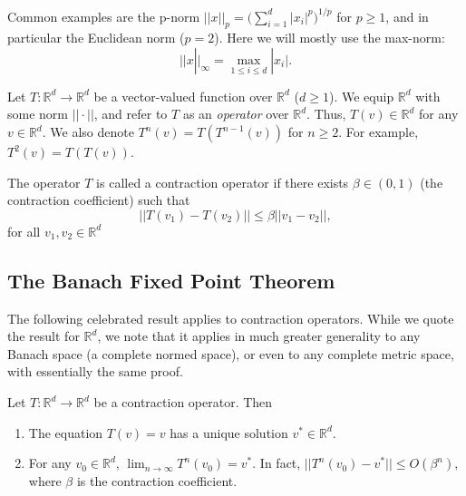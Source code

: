 Common examples are the p-norm $||x|{|_p} = (\sum\nolimits_{i = 1}^d
{{{|{x_i}|}^p}{)^{1/p}}} $ for $p \ge 1$, and in particular the
Euclidean norm ($p = 2$). Here we will mostly use the max-norm:
\[||x|{|_\infty } = {\max _{1 \le i \le d}}|{x_i}|.\]

Let $T:\mathbb R^d \to \mathbb R^d$  be a vector-valued function
over $\mathbb R^d$   ($d \ge 1$).
%
We equip $\mathbb R^d$ with some norm $||
\cdot ||$, and refer to $T$ as an \emph{operator } over $\mathbb
R^d$. Thus, $T(v) \in \mathbb R^d$ for any $v \in \mathbb R^d$. We
also denote ${T^n}(v) = T({T^{n - 1}}(v))$ for  $n \ge 2$. For
example, ${T^2}(v) = T(T(v))$.

\begin{definition} The operator $T$ is called a contraction operator if there exists $\beta  \in (0,1)$ (the contraction coefficient) such that
\[||T({v_1}) - T({v_2})|| \le \beta ||{v_1} - {v_2}||,\]
for all $v_1,v_2 \in \mathbb R^d$
\end{definition}

\subsection{The Banach Fixed Point Theorem}
The following celebrated result applies to contraction operators. While we quote the result for $\mathbb R^d$, we note that it applies in much greater generality to any Banach space (a complete normed space), or even to any complete metric space, with essentially the same proof.

\begin{theorem}
\label{chapter-discount:thm:Banach}
 Let $T:\mathbb R^d \to \mathbb R^d$  be a
contraction operator. Then
\begin{enumerate}
  \item The equation $T(v) = v$ has a unique solution  $v^*\in \mathbb R^d$.
  \item For any $v_0 \in \mathbb R^d$,  ${\lim _{n \to \infty }}{T^n}({v_0}) = {v^*}$.
          In fact,  $||{T^n}({v_0}) - {v^*}|| \le O({\beta ^n})$, where $\beta $ is the contraction coefficient.
\end{enumerate}
\end{theorem}

